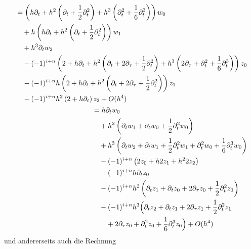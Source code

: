 \begin{align}
\begin{split}
&= \left( h \partial_t + h^2 \left( \partial_t + \frac{1}{2} \partial^2_t \right) + h^3 \left( \partial^2_t + \frac{1}{6} \partial^3_t \right) \right) w_0\\
&\quad + h \left(h \partial_t + h^2 \left( \partial_t + \frac{1}{2} \partial^2_t \right) \right) w_1\\
&\quad + h^3 \partial_t w_2\\
&\quad - (-1)^{i+n}     \left( 2 + h \partial_t + h^2 \left( \partial_t + 2 \partial_\tau + \frac{1}{2} \partial^2_t \right) + h^3 \left( 2 \partial_\tau + \partial^2_t + \frac{1}{6} \partial^3_t \right) \right) z_0\\
&\quad - (-1)^{i+n} h   \left( 2 + h \partial_t + h^2 \left( \partial_t + 2 \partial_\tau + \frac{1}{2} \partial^2_t \right) \right) z_1\\
&\quad - (-1)^{i+n} h^2 \left( 2 + h \partial_t \right) z_2 + O(h^4)
\end{split}\\
\label{eq:apx:mega_lang1}
\begin{split}
&=  h \partial_t w_0 \\
&\quad + h^2 \left( \partial_t w_1 + \partial_t w_0 + \frac{1}{2} \partial^2_t w_0 \right)\\
&\quad + h^3 \left( \partial_t w_2 + \partial_t w_1 + \frac{1}{2} \partial^2_t w_1 + \partial^2_t w_0 + \frac{1}{6} \partial^3_t w_0 \right)\\
&\quad - (-1)^{i+n} \left( 2 z_0 + h 2 z_1 + h^2 2 z_2 \right)\\
&\quad - (-1)^{i+n} h \partial_t z_0\\
&\quad - (-1)^{i+n} h^2 \left( \partial_t z_1 + \partial_t z_0 + 2 \partial_\tau z_0 + \frac{1}{2} \partial^2_t z_0 \right)\\
&\quad - (-1)^{i+n} h^3 \Bigl( \partial_t z_2 + \partial_t z_1 + 2 \partial_\tau z_1 + \frac{1}{2} \partial^2_t z_1\\
&\qquad + 2 \partial_\tau z_0 + \partial^2_t z_0+ \frac{1}{6} \partial^3_t z_0 \Bigr) + O(h^4)\\
\end{split}
\end{align}
und andererseits auch die Rechnung
